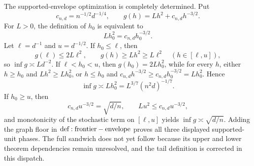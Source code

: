 The supported-envelope optimization is completely determined.  Put
\[
 c_{n,d}=n^{-1/2}d^{-1/4},\qquad
 g(h)=Lh^2+c_{n,d}h^{-3/2}.
\]
For \(L>0\), the definition of \(h_0\) is equivalent to
\[
 Lh_0^2=c_{n,d}h_0^{-3/2}.
\]
Let \(\ell=d^{-1}\) and \(u=d^{-1/2}\).  If \(h_0\leq\ell\), then
\[
 g(\ell)\leq2L\ell^2,
 \qquad
 g(h)\geq Lh^2\geq L\ell^2\quad(h\in[\ell,u]),
\]
so \(\inf g\asymp Ld^{-2}\).  If \(\ell<h_0<u\), then \(g(h_0)=2Lh_0^2\), while for every \(h\), either \(h\geq h_0\) and \(Lh^2\geq Lh_0^2\), or \(h\leq h_0\) and \(c_{n,d}h^{-3/2}\geq c_{n,d}h_0^{-3/2}=Lh_0^2\).  Hence
\[
 \inf g\asymp Lh_0^2=L^{3/7}(n^2d)^{-1/7}.
\]
If \(h_0\geq u\), then
\[
 c_{n,d}u^{-3/2}=\sqrt{d/n},\qquad
 Lu^2\leq c_{n,d}u^{-3/2},
\]
and monotonicity of the stochastic term on \([\ell,u]\) yields \(\inf g\asymp\sqrt{d/n}\).  Adding the graph floor in \({\rm def:frontier-envelope}\) proves all three displayed supported-unit phases.  The full sandwich does not yet follow because its upper and lower theorem dependencies remain unresolved, and the tail definition is corrected in this dispatch.